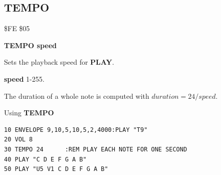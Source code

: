 
\newpage
\subsection{TEMPO}
\begin{description}[leftmargin=2cm,style=nextline]
\item [Token:] \$FE \$05
\item [Format:] {\bf TEMPO speed}
\item [Usage:] Sets the playback speed for {\bf PLAY}.

               {\bf speed} 1-255.

               The duration of a whole note is computed with
               $ duration = 24 / speed $.

\item [Example:] Using {\bf TEMPO}
\begin{tcolorbox}[colback=black,coltext=white]
\verbatimfont{\codefont}
\begin{verbatim}
10 ENVELOPE 9,10,5,10,5,2,4000:PLAY "T9"
20 VOL 8
30 TEMPO 24      :REM PLAY EACH NOTE FOR ONE SECOND
40 PLAY "C D E F G A B"
50 PLAY "U5 V1 C D E F G A B"
\end{verbatim}
\end{tcolorbox}
\end{description}


\newpage
